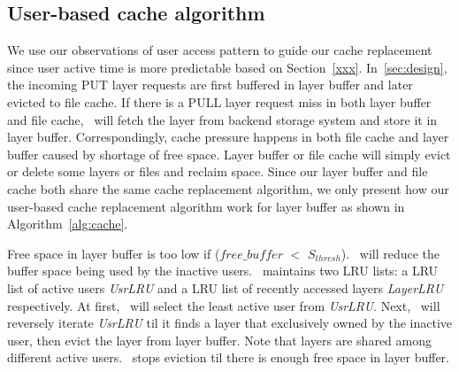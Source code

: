 \subsection{User-based cache algorithm}
\label{sec:design_cache_algori}



We use our observations of user access pattern to guide our cache replacement
since user active time is more predictable based on Section~\ref{xxx}.
In~\cref{sec:design}, the incoming PUT layer requests are first buffered in layer buffer and later evicted to file cache.
If there is a PULL layer request miss in both layer buffer and file cache, 
\sysname~will fetch the layer from backend storage system and store it in layer buffer.
Correspondingly, cache pressure happens in both file cache and layer buffer caused by shortage of free space.
Layer buffer or file cache will simply evict or delete some layers or files and reclaim space.
Since our layer buffer and file cache both share the same cache replacement algorithm, we only present
how our user-based cache replacement algorithm work for layer buffer as shown in Algorithm~\ref{alg:cache}.

Free space in layer buffer is too low if ($free\_buffer$ $<$ $S_{thresh}$). 
\sysname~will reduce the buffer space being used by the inactive users. 
\sysname~maintains two LRU lists: a LRU list of active users \emph{UsrLRU} and
a LRU list of recently accessed layers \emph{LayerLRU} respectively.
At first, \sysname~will select the least active user from \emph{UsrLRU}.
Next, \sysname~will reversely iterate \emph{UsrLRU} til it finds a layer that exclusively owned by the inactive user, 
then evict the layer from layer buffer. 
 Note that layers are shared among different active users.
 \sysname~stops eviction til there is enough free space in layer buffer.
 


